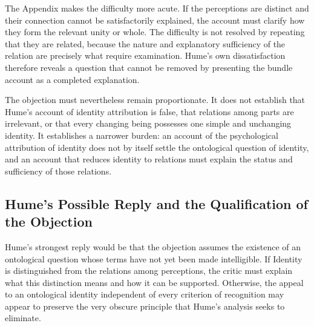The Appendix makes the difficulty more acute.
If the perceptions are distinct and their connection
cannot be satisfactorily explained, the account
must clarify how they form the relevant unity
or whole. The difficulty is not resolved by
repeating that they are related, because the
nature and explanatory sufficiency of the relation
are precisely what require examination. Hume's
own dissatisfaction therefore reveals a question
that cannot be removed by presenting the bundle
account as a completed explanation.
\cite[Appendix, paragraphs 19--21, SBN 635--636]{HumeTreatise}

\label{para:VS.B01.P01.C08.S09.SS11.P005}

The objection must nevertheless remain proportionate.
It does not establish that Hume's account of
identity attribution is false, that relations
among parts are irrelevant, or that every changing
being possesses one simple and unchanging identity.
It establishes a narrower burden: an account
of the psychological attribution of identity
does not by itself settle the ontological question
of identity, and an account that reduces identity
to relations must explain the status and sufficiency
of those relations.



\subsection{Hume's Possible Reply and the Qualification of the Objection}
\label{subsec:ch08-hume-reply}

\label{para:VS.B01.P01.C08.S09.SS12.P001}

Hume's strongest reply would be that the objection
assumes the existence of an ontological question
whose terms have not yet been made intelligible.
If Identity is distinguished from the relations
among perceptions, the critic must explain what
this distinction means and how it can be supported.
Otherwise, the appeal to an ontological identity
independent of every criterion of recognition
may appear to preserve the very obscure principle
that Hume's analysis seeks to eliminate.

\label{para:VS.B01.P01.C08.S09.SS12.P002}

